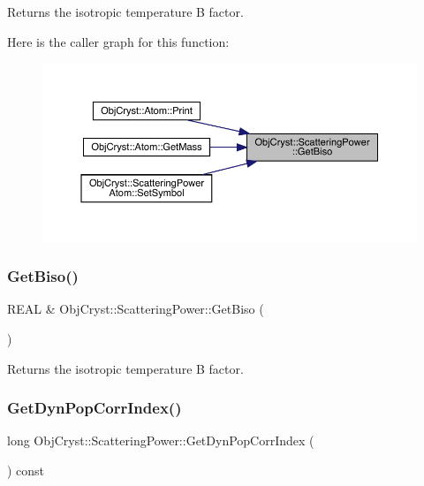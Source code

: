 Returns the isotropic temperature B factor. 

Here is the caller graph for this function\+:
\nopagebreak
\begin{figure}[H]
\begin{center}
\leavevmode
\includegraphics[width=350pt]{class_obj_cryst_1_1_scattering_power_a410cbc9c760375aff093a901fd8ad0dd_icgraph}
\end{center}
\end{figure}
\mbox{\label{class_obj_cryst_1_1_scattering_power_a5f76422be4dc1879b9c7a64f9b2127d5}} 
\subsubsection{\texorpdfstring{GetBiso()}{GetBiso()}\hspace{0.1cm}{\footnotesize\ttfamily [2/2]}}
{\footnotesize\ttfamily R\+E\+AL \& Obj\+Cryst\+::\+Scattering\+Power\+::\+Get\+Biso (\begin{DoxyParamCaption}{ }\end{DoxyParamCaption})}



Returns the isotropic temperature B factor. 

\mbox{\label{class_obj_cryst_1_1_scattering_power_a7cdd8e3a157936fe5bf2af136e7b1f2e}} 
\subsubsection{\texorpdfstring{GetDynPopCorrIndex()}{GetDynPopCorrIndex()}}
{\footnotesize\ttfamily long Obj\+Cryst\+::\+Scattering\+Power\+::\+Get\+Dyn\+Pop\+Corr\+Index (\begin{DoxyParamCaption}{ }\end{DoxyParamCaption}) const}

